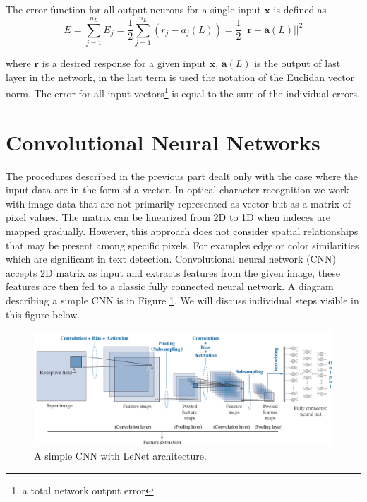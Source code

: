 The error function for all output neurons for a single input $\bm{x}$ is defined as
\begin{equation} E = \sum_{j=1} ^{n_L} E_j = \frac{1}{2}\sum_{j=1} ^{n_L} (r_j-a_j(L)) = \frac{1}{2} ||\bm{r} - \bm{a}(L)||^2 \end{equation}

where $\bm{r}$ is a desired response for a given input $\bm{x}$, $\bm{a}(L)$ is the output of last layer in the network, in the last term is used the notation of the Euclidan vector norm. The error for all input vectors\footnote{a total  network output error} is equal to the sum of the individual errors.\cite{DIP}

\section{Convolutional Neural Networks}

The procedures described in the previous part dealt only with the case where the input data are in the form of a vector. In optical character recognition we work with image data that are not primarily represented as vector but as a matrix of pixel values. The matrix can be linearized from 2D to 1D when indeces are mapped gradually. However,  this approach does not consider spatial relationships that may be present among specific pixels. For examples edge or color similarities which are significant in text detection. Convolutional neural network (CNN) accepts 2D matrix as input and extracts features from the given image, these features are then fed to a classic fully connected neural network. A diagram describing  a simple CNN is in Figure \ref*{img:CNN}. We will discuss individual steps visible in this figure below.\cite{DIP}

\begin{figure}[hbtp]
    \centering
    \includegraphics[scale=0.4]{obrazky/CNN.png}

    \caption{A simple CNN with LeNet architecture.\cite[altered]{DIP}}
    \label{img:CNN}
\end{figure}

